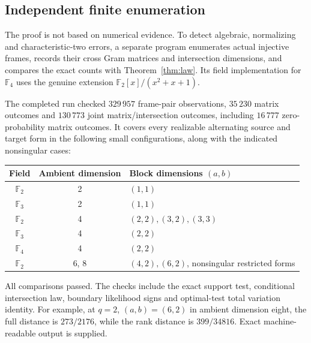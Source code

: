 \documentclass[11pt]{article}
\numberwithin{equation}{section}
\theoremstyle{definition}
\theoremstyle{remark}
\newcommand{\F}{\mathbb F}
\begin{document}
\subsection{Independent finite enumeration}
The proof is not based on numerical evidence. To detect algebraic, normalizing and characteristic-two errors, a separate program enumerates actual injective frames, records their cross Gram matrices and intersection dimensions, and compares the exact counts with Theorem~\ref{thm:law}. Its field implementation for $\F_4$ uses the genuine extension $\F_2[x]/(x^2+x+1)$.

The completed run checked $329\,957$ frame-pair observations, $35\,230$ matrix outcomes and $130\,773$ joint matrix/intersection outcomes, including $16\,777$ zero-probability matrix outcomes. It covers every realizable alternating source and target form in the following small configurations, along with the indicated nonsingular cases:
\begin{center}\small
\begin{tabular}{ccl}
\toprule
Field & Ambient dimension & Block dimensions $(a,b)$\\
\midrule
$\F_2$ & 2 & $(1,1)$\\
$\F_3$ & 2 & $(1,1)$\\
$\F_2$ & 4 & $(2,2),(3,2),(3,3)$\\
$\F_3$ & 4 & $(2,2)$\\
$\F_4$ & 4 & $(2,2)$\\
$\F_2$ & 6, 8 & $(4,2),(6,2)$, nonsingular restricted forms\\
\bottomrule
\end{tabular}
\end{center}
All comparisons passed. The checks include the exact support test, conditional intersection law, boundary likelihood signs and optimal-test total variation identity. For example, at $q=2$, $(a,b)=(6,2)$ in ambient dimension eight, the full distance is $273/2176$, while the rank distance is $399/34816$. Exact machine-readable output is supplied.
\end{document}
